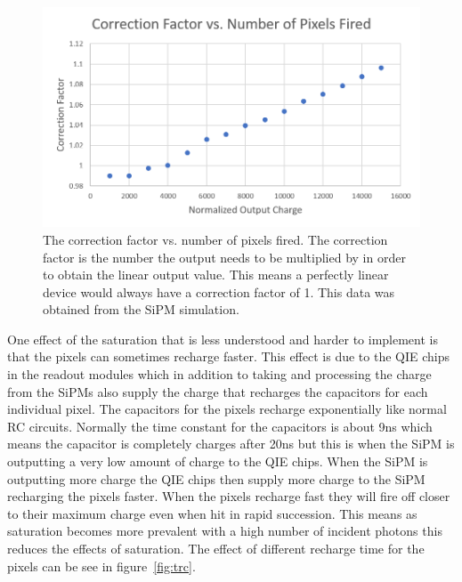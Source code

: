 \begin{figure}
\centering
\includegraphics[width=\linewidth]{Figures/CorFac.png}
\caption{The correction factor vs. number of pixels fired. The correction factor is the number the output needs to be multiplied by in order to obtain the linear output value. This means a perfectly linear device would always have a correction factor of 1. This data was obtained from the SiPM simulation.}
\label{fig:Cor}
\end{figure}

One effect of the saturation that is less understood and harder to implement is that the pixels can sometimes recharge faster. This effect is due to the QIE chips in the readout modules which in addition to taking and processing the charge from the SiPMs also supply the charge that recharges the capacitors for each individual pixel. The capacitors for the pixels recharge exponentially like normal RC circuits. Normally the time constant for the capacitors is about 9ns which means the capacitor is completely charges after 20ns but this is when the SiPM is outputting a very low amount of charge to the QIE chips. When the SiPM is outputting more charge the QIE chips then supply more charge to the SiPM recharging the pixels faster. When the pixels recharge fast they will fire off closer to their maximum charge even when hit in rapid succession. This means as saturation becomes more prevalent with a high number of incident photons this reduces the effects of saturation. The effect of different recharge time for the pixels can be see in figure~\ref{fig:trc}.

